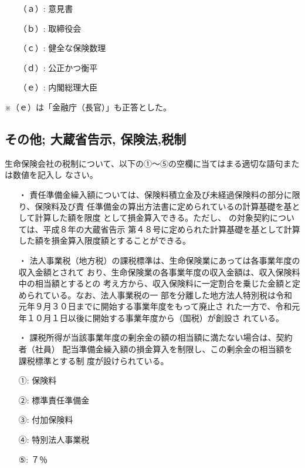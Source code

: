 \documentclass[report,gutter=10mm,fore-edge=10mm,uplatex,dvipdfmx]{jlreq}
\begin{document}
\answer{}
\begin{itemize}
\item[ （ａ）: ] 意見書
\item[ （ｂ）: ] 取締役会
\item[ （ｃ）: ] 健全な保険数理
\item[ （ｄ）: ] 公正かつ衡平
\item[ （ｅ）: ] 内閣総理大臣
\end{itemize}
※（ｅ）は「金融庁（長官）」も正答とした。
\subsection{その他; 大蔵省告示, 保険法,税制}

生命保険会社の税制について、以下の①～⑤の空欄に当てはまる適切な語句または数値を記入し
なさい。

\begin{itemize}
\item[・] 責任準備金繰入額については、保険料積立金及び未経過保険料の部分に限り、保険料及び責
任準備金の算出方法書に定められているの計算基礎を基として計算した額を限度
として損金算入できる。ただし、
の対象契約については、平成８年の大蔵省告示
第４８号に定められた計算基礎を基として計算した額を損金算入限度額とすることができる。
\item[・] 法人事業税（地方税）の課税標準は、生命保険業にあっては各事業年度の収入金額とされて
おり、生命保険業の各事業年度の収入金額は、収入保険料中の相当額とするとの
考え方から、収入保険料に一定割合を乗じた金額と定められている。なお、法人事業税の一
部を分離した地方法人特別税は令和元年９月３０日までに開始する事業年度をもって廃止さ
れた一方で、令和元年１０月１日以後に開始する事業年度から（国税）が創設さ
れている。
\item[・] 課税所得が当該事業年度の剰余金の額の相当額に満たない場合は、契約者（社員）
配当準備金繰入額の損金算入を制限し、この剰余金の相当額を課税標準とする制
度が設けられている。
\end{itemize}
\answer{}
\begin{itemize}
\item[ ①: ] 保険料
\item[ ②: ] 標準責任準備金
\item[ ③: ] 付加保険料
\item[ ④: ] 特別法人事業税
\item[ ⑤: ] ７％
\end{itemize}
\end{document}
